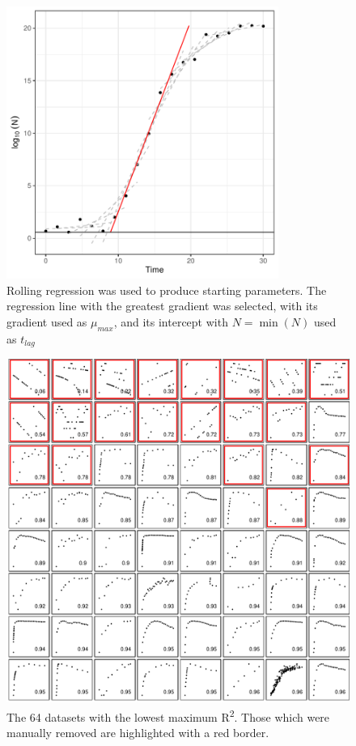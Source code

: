 \documentclass[11pt, a4paper]{article}
\begin{document}
        
        \begin{figure}[H]
        \centering
        \includegraphics[width=3.5in]{../results/rolling_reg.pdf}
        \caption{Rolling regression was used to produce starting parameters. The regression line with the greatest gradient was selected, with its gradient used as $\mu_{max}$, and its intercept with $N = \min(N)$ used as $t_{lag}$ }
        \label{sup:rolling_regression}
        \end{figure}  
        
        
         \begin{figure}[H]
        \includegraphics[width=\linewidth]{../results/removed_ids.pdf}
        \caption{The 64 datasets with the lowest maximum R\textsuperscript{2}. Those which were manually removed are highlighted with a red border.}
        \label{sup:removed_ids}
        \end{figure}
        
\end{document}
